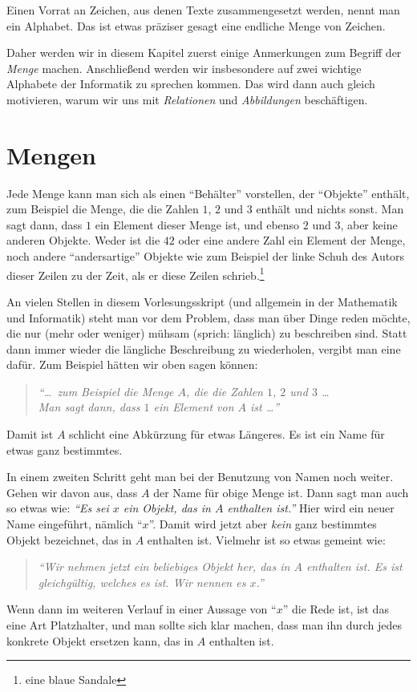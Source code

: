 Einen Vorrat an Zeichen, aus denen Texte zusammengesetzt werden, nennt
man ein Alphabet.
%
Das ist etwas präziser gesagt eine endliche Menge von Zeichen.

Daher werden wir in diesem Kapitel zuerst einige Anmerkungen zum
Begriff der \emph{Menge} machen.
%
Anschließend werden wir insbesondere auf zwei wichtige Alphabete der
Informatik zu sprechen kommen.
%
Das wird dann auch gleich motivieren, warum wir uns mit
\emph{Relationen} und \emph{Abbildungen} beschäftigen.

\Tut\section{Mengen}
\label{subsec:mengen}

Jede Menge kann man sich als einen "`Behälter"' vorstellen, der
"`Objekte"' enthält, zum Beispiel die Menge, die die Zahlen $1$,
$2$ und $3$ enthält und nichts sonst.
%
Man sagt dann, dass $1$ ein Element dieser Menge ist, und ebenso
$2$ und $3$,
aber keine anderen Objekte.
%
Weder ist die $42$ oder eine andere Zahl ein Element der Menge, noch andere
"`andersartige"' Objekte wie zum Beispiel der linke Schuh des Autors
dieser Zeilen zu der Zeit, als er diese Zeilen schrieb.\footnote{eine
  blaue Sandale}

An vielen Stellen\graffito{\textcolor{red!50!black}{eine ganz wichtige
    allgemeine Bemerkung}} in diesem Vorlesungsskript (und allgemein
in der Mathematik und Informatik) steht man vor dem Problem, dass man
über Dinge reden möchte, die nur (mehr oder weniger) mühsam (sprich:
länglich) zu beschreiben sind.
%
Statt dann immer wieder die längliche Beschreibung zu wiederholen,
vergibt man eine  dafür.
%
Zum Beispiel hätten wir oben sagen können:
%
\begin{quote}
  \emph{"`\ldots\ zum Beispiel die Menge $A$, die die Zahlen $1$,
    $2$ und $3$ \dots \\
    Man sagt dann, dass $1$ ein Element von $A$ ist \dots"'}
\end{quote}
%
Damit ist $A$ schlicht eine Abkürzung für etwas Längeres.
%
Es ist ein Name für etwas ganz bestimmtes.

In einem zweiten Schritt geht man bei der Benutzung von Namen noch weiter.
%
Gehen wir davon aus, dass $A$ der Name für obige Menge ist.
%
Dann sagt man auch so etwas wie: \emph{"`Es sei $x$
  ein Objekt, das in $A$ enthalten ist."'}
%
Hier wird ein neuer Name eingeführt, nämlich "`$x$"'.
%
Damit wird jetzt aber \emph{kein} ganz bestimmtes Objekt bezeichnet,
das in $A$ enthalten ist.
%
Vielmehr ist so etwas gemeint wie:
%
\begin{quote}
  \emph{"`Wir nehmen jetzt ein beliebiges Objekt her, das in $A$
    enthalten ist. Es ist gleichgültig, welches es ist. Wir nennen es
    $x$."'}
\end{quote}
%
Wenn dann im weiteren Verlauf in einer Aussage von "`$x$"'
die Rede ist, ist das eine Art Platzhalter, und man sollte sich klar
machen, dass man ihn durch jedes konkrete Objekt ersetzen kann, das in
$A$ enthalten ist.

